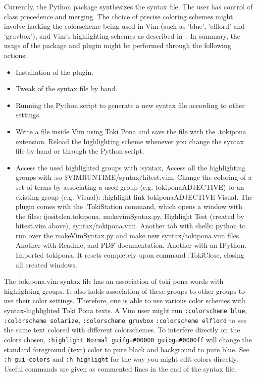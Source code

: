 \documentclass{article}
\newcommand{\tttt}[1]{\texttt{#1}}
\begin{document}
Currently, the Python package synthesizes the
syntax file.
The user has control of class precedence and
merging.
The choice of precise coloring schemes
might involve hacking the colorscheme being
used in Vim (such as 'blue', 'elflord' and 'gruvbox'),
and Vim's highlighting schemes as described in~\cite{vimArt}.
In summary,
the usage of the package and plugin might be performed
through the following actions:
\begin{itemize}
  \item Installation of the plugin.
  \item Tweak of the syntax file by hand.
  \item Running the Python script to generate a new syntax file
    according to other settings.
  \item Write a file inside Vim using Toki Pona and save
    the file with the .tokipona extension.
    Reload the highlighting scheme whenever you
    change the syntax file by hand or through the Python script.
  \item Access the used highlighted groups with :syntax,
    Access all the highlighting groups with :so \$VIMRUNTIME/syntax/hitest.vim.
    Change the coloring of a set of terms by associating
    a used group (e.g. tokiponaADJECTIVE) to an existing group (e.g. Visual):
    :highlight link tokiponaADJECTIVE Visual.
    The plugin comes with the :TokiStation command, which opens a window with
    the files: ijositelen.tokipona, makevimSyntax.py, Highlight Test (created by hitest.vim above), syntax/tokipona.vim.
    Another tab with shells: python to run over the makeVimSyntax.py and make new syntax/tokipona.vim files. Another with Readme, and PDF documentation. Another with an IPython.
    Imported tokipona. It resets completely upon command :TokiClose, closing all created windows.
\end{itemize}

The tokipona.vim syntax file has an association of toki pona
words with highlighting groups.
It also holds association of these groups to other groups
to use their color settings.
Therefore, one is able to use various color schemes
with syntax-highlighted Toki Pona texts.
A Vim user might run \tttt{:colorscheme blue},
\tttt{:colorscheme solarize}, \tttt{:colorscheme gruvbox}
\tttt{:colorscheme elflord} to see the same text colored
with different colorschemes.
To interfere directly on the colors chosen,
\tttt{:highlight Normal guifg=\#00000 guibg=\#0000ff}
will change the standard foreground (text) color to pure black
and background to pure blue.
See \tttt{:h gui-colors} and \tttt{:h highlight}
for the way you might edit colors directly.
Useful commands are given as commented lines
in the end of the syntax file.
\end{document}

